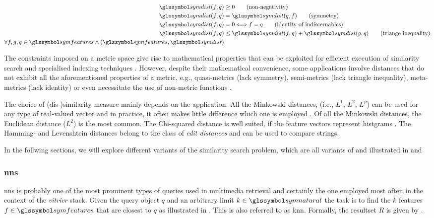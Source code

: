 \begin{align}
  \label{eq:metric}
   \symdist(f,q) &\geq 0                           \tag{non-negativity} \\
   \symdist(f,q) &= \symdist(q,f)                    \tag{symmetry}\\
   \symdist(f,q) &= 0 \Longleftrightarrow f = q    \tag{identity of indiscernables}\\
   \symdist(f,q) &\leq  \symdist(f,g) +  \symdist(g,q)   \tag{triange inequality}\\
   \forall f,g,q \in \symfeatures \wedge (\symfeatures, \symdist) \nonumber
\end{align}

The constraints imposed on a metric space give rise to mathematical properties that can be exploited for efficient execution of similarity search and specialised indexing techniques \cite{Zezula:2006Similarity}. However, despite their mathematical convenience, some applications involve distances that do not exhibit all the aforementioned properties of a metric, e.g., quasi-metrics (lack symmetry), semi-metrics (lack triangle inequality), meta-metrics (lack identity) \cite{Zezula:2006Similarity} or even necessitate the use of non-metric functions \cite{Skopal:2011Nonmetric}.

The choice of (dis-)similarity measure mainly depends on the application. All the Minkowski distances, (i.e., $L^1$, $L^2$, $L^p$) can be used for any type of real-valued vector and in practice, it often makes little difference which one is employed \cite{Rossetto:2018Multi}. Of all the Minkowski distances, the Euclidean distance ($L^2$) is the most common. The Chi-squared distance is well suited, if the feature vectors represent histgrams \cite{Pele:2010Quadratic}. The Hamming- and Levenshtein distances belong to the class of \emph{edit distances} and can be used to compare strings.

In the follwing sections, we will explore different variants of the similarity search problem, which are all variants of  and illustrated in  and 

\subsubsection{\texorpdfstring{\acrfull{nns}}{Nearest Neighbour Search (NNS)}}

\acrshort{nns} is probably one of the most prominent types of queries used in multimedia retrieval and certainly the one employed most often in the context of the \emph{vitrivr} \cite{Rossetto:2016Vitrivr,Gasser:2019Multimodal} stack. Given the query object $q$ and an arbitrary limit $k \in \symnatural$ the task is to find the $k$ features $f \in \symfeatures$ that are closest to $q$ as illustrated in . This is also referred to as \acrfull{knn}. Formally, the resultset $R$ is given by .

